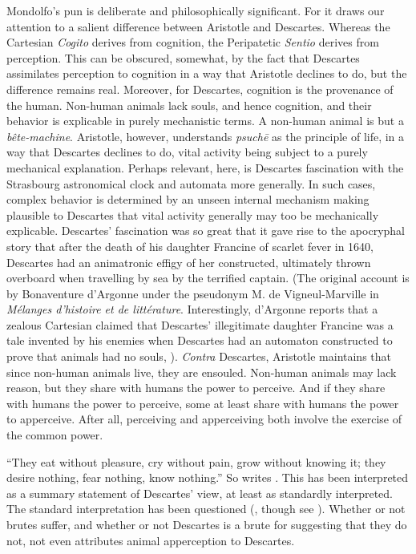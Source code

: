 Mondolfo's pun is deliberate and philosophically significant. For it draws our attention to a salient difference between Aristotle and Descartes. Whereas the Cartesian \emph{Cogito} derives from cognition, the Peripatetic \emph{Sentio} derives from perception. This can be obscured, somewhat, by the fact that Descartes assimilates perception to cognition in a way that Aristotle declines to do, but the difference remains real. Moreover, for Descartes, cognition is the provenance of the human. Non-human animals lack souls, and hence cognition, and their behavior is explicable in purely mechanistic terms. A non-human animal is but a \emph{b\^{e}te-machine}. Aristotle, however, understands \emph{psuchē} as the principle of life, in a way that Descartes declines to do, vital activity being subject to a purely mechanical explanation. Perhaps relevant, here, is Descartes fascination with the Strasbourg astronomical clock and automata more generally. In such cases, complex behavior is determined by an unseen internal mechanism making plausible to Descartes that vital activity generally may too be mechanically explicable. Descartes' fascination was so great that it gave rise to the apocryphal story that after the death of his daughter Francine of scarlet fever in 1640, Descartes had an animatronic effigy of her constructed, ultimately thrown overboard when travelling by sea by the terrified captain. (The original account is by Bonaventure d’Argonne under the pseudonym M. de Vigneul-Marville in \emph{M\'{e}langes d'histoire et de litt\'{e}rature}. Interestingly, d'Argonne reports that a zealous Cartesian claimed that Descartes' illegitimate daughter Francine was a tale invented by his enemies when Descartes had an automaton constructed to prove that animals had no souls, \citealt{Kang:2017tb}). \emph{Contra} Descartes, Aristotle maintains that since non-human animals live, they are ensouled. Non-human animals may lack reason, but they share with humans the power to perceive. And if they share with humans the power to perceive, some at least share with humans the power to apperceive. After all, perceiving and apperceiving both involve the exercise of the common power.

``They eat without pleasure, cry without pain, grow without knowing it; they desire nothing, fear nothing, know nothing.'' So writes \citet[]{Malebranche:1958dp}. This has been interpreted as a summary statement of Descartes' view, at least as standardly interpreted. The standard interpretation has been questioned (\citealt{Cottingham:2009uc}, though see \citealt{Miller:2013ib}). Whether or not brutes suffer, and whether or not Descartes is a brute for suggesting that they do not, not even \citet{Cottingham:2009uc} attributes animal apperception to Descartes.

